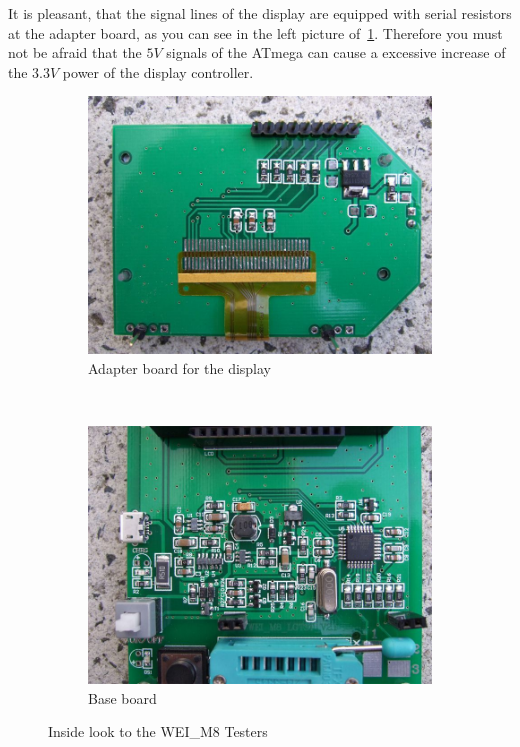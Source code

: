 It is pleasant, that the signal lines of the display are equipped with serial resistors
at the adapter board, as you can see in the left picture of~\ref{fig:WeiM8int}.
Therefore you must not be afraid that the \(5V\) signals of the ATmega can cause a excessive
increase of the \(3.3V\) power of the display controller.

\begin{figure}[H]
  \begin{subfigure}[b]{.5\textwidth}
    \centering
    \includegraphics[width=1.\textwidth]{../PNG/WEI_M8_D.JPG}
    \caption{Adapter board for the display}
  \end{subfigure}
  ~
  \begin{subfigure}[b]{.5\textwidth}
    \centering
    \includegraphics[width=1.\textwidth]{../PNG/WEI_M8_L.JPG}
    \caption{Base board}
  \end{subfigure}
  \caption{Inside look to the WEI\_M8 Testers}
  \label{fig:WeiM8int}
\end{figure}

